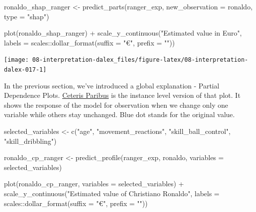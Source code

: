 \documentclass[
]{scrbook}
\newenvironment{Shaded}{\begin{snugshade}}{\end{snugshade}}
\newcommand{\AttributeTok}[1]{\textcolor[rgb]{0.77,0.63,0.00}{#1}}
\newcommand{\FunctionTok}[1]{\textcolor[rgb]{0.00,0.00,0.00}{#1}}
\newcommand{\NormalTok}[1]{#1}
\newcommand{\OtherTok}[1]{\textcolor[rgb]{0.56,0.35,0.01}{#1}}
\newcommand{\SpecialCharTok}[1]{\textcolor[rgb]{0.00,0.00,0.00}{#1}}
\newcommand{\StringTok}[1]{\textcolor[rgb]{0.31,0.60,0.02}{#1}}
\renewenvironment{Shaded} {\begin{snugshade}\small} {\end{snugshade}}
\begin{document}
\begin{Shaded}
\begin{Highlighting}[]
\NormalTok{ronaldo\_shap\_ranger }\OtherTok{\textless{}{-}} \FunctionTok{predict\_parts}\NormalTok{(ranger\_exp,}
                        \AttributeTok{new\_observation =}\NormalTok{ ronaldo,}
                        \AttributeTok{type =} \StringTok{"shap"}\NormalTok{)}

\FunctionTok{plot}\NormalTok{(ronaldo\_shap\_ranger) }\SpecialCharTok{+}
  \FunctionTok{scale\_y\_continuous}\NormalTok{(}\StringTok{"Estimated value in Euro"}\NormalTok{, }\AttributeTok{labels =}\NormalTok{ scales}\SpecialCharTok{::}\FunctionTok{dollar\_format}\NormalTok{(}\AttributeTok{suffix =} \StringTok{"€"}\NormalTok{, }\AttributeTok{prefix =} \StringTok{""}\NormalTok{))}
\end{Highlighting}
\end{Shaded}

\begin{center}\texttt{[image: 08-interpretation-dalex\_files/figure-latex/08-interpretation-dalex-017-1]} \end{center}

In the previous section, we've introduced a global explanation - Partial Dependence Plots. \href{https://pbiecek.github.io/ema/ceterisParibus.html}{Ceteris Paribus} is the instance level version of that plot. It shows the response of the model for observation when we change only one variable while others stay unchanged. Blue dot stands for the original value.

\begin{Shaded}
\begin{Highlighting}[]
\NormalTok{selected\_variables }\OtherTok{\textless{}{-}} \FunctionTok{c}\NormalTok{(}\StringTok{"age"}\NormalTok{, }\StringTok{"movement\_reactions"}\NormalTok{,}
                \StringTok{"skill\_ball\_control"}\NormalTok{, }\StringTok{"skill\_dribbling"}\NormalTok{)}

\NormalTok{ronaldo\_cp\_ranger }\OtherTok{\textless{}{-}} \FunctionTok{predict\_profile}\NormalTok{(ranger\_exp, ronaldo, }\AttributeTok{variables =}\NormalTok{ selected\_variables)}

\FunctionTok{plot}\NormalTok{(ronaldo\_cp\_ranger, }\AttributeTok{variables =}\NormalTok{ selected\_variables) }\SpecialCharTok{+}
  \FunctionTok{scale\_y\_continuous}\NormalTok{(}\StringTok{"Estimated value of Christiano Ronaldo"}\NormalTok{, }\AttributeTok{labels =}\NormalTok{ scales}\SpecialCharTok{::}\FunctionTok{dollar\_format}\NormalTok{(}\AttributeTok{suffix =} \StringTok{"€"}\NormalTok{, }\AttributeTok{prefix =} \StringTok{""}\NormalTok{))}
\end{Highlighting}
\end{Shaded}
\end{document}
